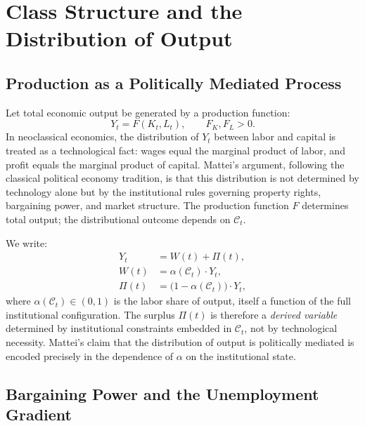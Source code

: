 \documentclass[12pt,a4paper]{article}
\theoremstyle{definition}
\theoremstyle{remark}
\begin{document}
\section{Class Structure and the Distribution of Output}
\label{sec:class}

\subsection{Production as a Politically Mediated Process}

Let total economic output be generated by a production function:
\begin{equation}
  Y_t = F(K_t, L_t), \qquad F_K, F_L > 0.
\end{equation}
In neoclassical economics, the distribution of $Y_t$ between labor and capital is treated as a technological fact: wages equal the marginal product of labor, and profit equals the marginal product of capital. Mattei's argument, following the classical political economy tradition, is that this distribution is not determined by technology alone but by the institutional rules governing property rights, bargaining power, and market structure. The production function $F$ determines total output; the distributional outcome depends on $\mathcal{C}_t$.

We write:
\begin{align}
  Y_t &= W(t) + \Pi(t), \\
  W(t) &= \alpha(\mathcal{C}_t) \cdot Y_t, \\
  \Pi(t) &= \bigl(1 - \alpha(\mathcal{C}_t)\bigr) \cdot Y_t,
\end{align}
where $\alpha(\mathcal{C}_t) \in (0,1)$ is the labor share of output, itself a function of the full institutional configuration. The surplus $\Pi(t)$ is therefore a \emph{derived variable} determined by institutional constraints embedded in $\mathcal{C}_t$, not by technological necessity. Mattei's claim that the distribution of output is politically mediated is encoded precisely in the dependence of $\alpha$ on the institutional state.

\subsection{Bargaining Power and the Unemployment Gradient}
\end{document}
